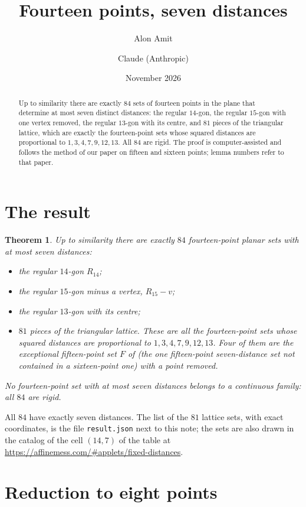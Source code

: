 \documentclass[11pt]{amsart}
\title{Fourteen points, seven distances}
\author{Alon Amit}
\author{Claude (Anthropic)}
\date{November 2026}
\newtheorem{theorem}{Theorem}
\theoremstyle{remark}
\begin{document}
\begin{abstract}
Up to similarity there are exactly $84$ sets of fourteen points in the plane that determine at most seven
distinct distances: the regular $14$-gon, the regular $15$-gon with one vertex removed, the regular
$13$-gon with its centre, and $81$ pieces of the triangular lattice, which are exactly the fourteen-point
sets whose squared distances are proportional to $1,3,4,7,9,12,13$. All $84$ are rigid. The proof is
computer-assisted and follows the method of our paper \cite{AC} on fifteen and sixteen points; lemma
numbers refer to that paper.
\end{abstract}

\maketitle

\section{The result}

\begin{theorem}\label{thm:14}
Up to similarity there are exactly $84$ fourteen-point planar sets with at most seven distances:
\begin{itemize}
\item the regular $14$-gon $R_{14}$;
\item the regular $15$-gon minus a vertex, $R_{15}-v$;
\item the regular $13$-gon with its centre;
\item $81$ pieces of the triangular lattice. These are all the fourteen-point sets whose squared distances
  are proportional to $1,3,4,7,9,12,13$. Four of them are the exceptional fifteen-point set $F$ of
  \cite[Section~8]{AC} (the one fifteen-point seven-distance set not contained in a sixteen-point one) with
  a point removed.
\end{itemize}
No fourteen-point set with at most seven distances belongs to a continuous family: all $84$ are rigid.
\end{theorem}

All $84$ have exactly seven distances. The list of the $81$ lattice sets, with exact coordinates, is the
file \texttt{result.json} next to this note; the sets are also drawn in the catalog of the cell $(14,7)$ of
the table at \url{https://affinemess.com/#applets/fixed-distances}.

\section{Reduction to eight points}
\end{document}

